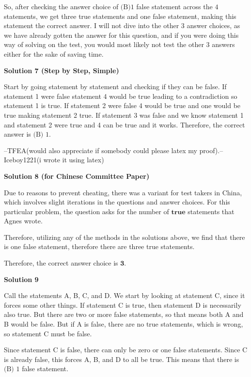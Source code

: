 \begin{enumerate}
 So, after checking the answer choice of $\boxed{\text{(B)} 1}$ false statement across the $4$ statements, we get three true statements and one false statement, making this statement the correct answer. I will not dive into the other $3$ answer choices, as we have already gotten the answer for this question, and if you were doing this way of solving on the test, you would most likely not test the other $3$ answers either for the sake of saving time. 

 



\textbf{Solution 7 (Step by Step, Simple)}

Start by going statement by statement and checking if they can be false. If statement 1 were false statement 4 would be true leading to a contradiction so statement 1 is true. If statement 2 were false 4 would be true and one would be true making statement 2 true. If statement 3 was false and we know statement 1 and statement 2 were true and 4 can be true and it works. Therefore, the correct answer is $\boxed{\text{(B) }1}$.

 --TFEA(would also appreciate if somebody could please latex my proof).--Iceboy1221(i wrote it using latex)

 



\textbf{Solution 8 (for Chinese Committee Paper)}

Due to reasons to prevent cheating, there was a variant for test takers in China, which involves slight iterations in the questions and answer choices. For this particular problem, the question asks for the number of $\mathbf{true}$ statements that Agnes wrote.

 Therefore, utilizing any of the methods in the solutions above, we find that there is one false statement, therefore there are three true statements.

 Therefore, the correct answer choice is $\mathbf{3}$.

 



\textbf{Solution 9}

Call the statements A, B, C, and D. We start by looking at statement C, since it forces some other things. If statement C is true, then statement D is necessarily also true. But there are two or more false statements, so that means both A and B would be false. But if A is false, there are no true statements, which is wrong, so statement C must be false.

 Since statement C is false, there can only be zero or one false statements. Since C is already false, this forces A, B, and D to all be true. This means that there is $\boxed{\text{(B) } 1}$ false statement.


\end{enumerate}
